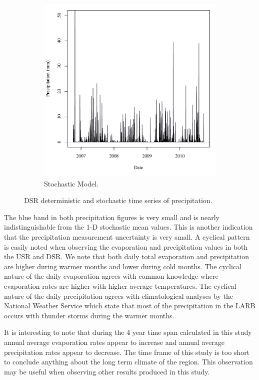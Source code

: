 \begin{linenumbers}
\begin{figure}[htbp]
\begin{subfigure}{0.5\textwidth}
		\includegraphics[width=0.9\linewidth]{"Figures/Results_DSR/A Precip"}
		\caption{Stochastic Model.}
		\label{sub:DSRPrecipS}
	\end{subfigure}
	\caption[DSR deterministic and stochastic time series of precipitation.]{DSR deterministic and stochastic time series of precipitation.}
	\label{fig:DSRPrecip}
\end{figure}

The blue band in both precipitation figures is very small and is nearly indistinguishable from the 1-D stochastic mean values.  This is another indication that the precipitation measurement uncertainty is very small.  A cyclical pattern is easily noted when observing the evaporation and precipitation values in both the USR and DSR.  We note that both daily total evaporation and precipitation are higher during warmer months and lower during cold months.  The cyclical nature of the daily evaporation agrees with common knowledge where evaporation rates are higher with higher average temperatures.  The cyclical nature of the daily precipitation agrees with climatological analyses by the National Weather Service which state that most of the precipitation in the LARB occurs with thunder storms during the warmer months.

It is interesting to note that during the 4 year time span calculated in this study annual average evaporation rates appear to increase and annual average precipitation rates appear to decrease.  The time frame of this study is too short to conclude anything about the long term climate of the region.  This observation may be useful when observing other results produced in this study.


\end{linenumbers}
